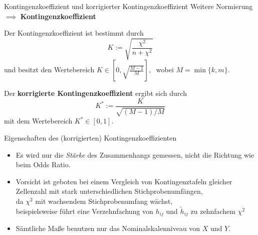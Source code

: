 \documentclass[
  10pt,
  ignorenonframetext,
]{beamer}
\providecommand{\tightlist}{%
  \setlength{\itemsep}{0pt}\setlength{\parskip}{0pt}}
\begin{document}

\begin{frame}{Kontingenzkoeffizient und korrigierter
Kontingenzkoeffizient}
\protect\hypertarget{kontingenzkoeffizient-und-korrigierter-kontingenzkoeffizient}{}
Weitere Normierung \(\implies\) \textbf{Kontingenzkoeffizient}

Der Kontingenzkoeffizient ist bestimmt durch \begin{displaymath}
K :=\sqrt{\frac{\chi^2}{n+\chi^2}}
\end{displaymath} und besitzt den Wertebereich
\(K\in\left[0,\sqrt{\frac{M-1}{M}}\right],\;\) wobei \(M=\min\{k,m\}.\)

Der \textbf{korrigierte Kontingenzkoeffizient} ergibt sich durch
\[K^* := \frac{K}{\sqrt{(M-1)/M}}\] mit dem Wertebereich
\(K^*\in[0,1]\).
\end{frame}

\begin{frame}{Eigenschaften des (korrigierten) Kontingenzkoeffizienten}
\protect\hypertarget{eigenschaften-des-korrigierten-kontingenzkoeffizienten}{}
\begin{itemize}
\tightlist
\item
  Es wird nur die \emph{Stärke} des Zusammenhangs gemessen, nicht die
  Richtung wie beim Odds Ratio.
\item
  Vorsicht ist geboten bei einem Vergleich von Kontingenztafeln gleicher
  Zellenzahl mit stark unterschiedlichen Stichprobenumfängen,\\
  da \(\chi^2\) mit wachsendem Stichprobenumfang wächst,\\
  beispielsweise führt eine Verzehnfachung von \(h_{ij}\) und
  \(\tilde h_{ij}\) zu zehnfachem \(\chi^2\)
\item
  Sämtliche Maße benutzen nur das Nominalskalenniveau von \(X\) und
  \(Y\).
\end{itemize}
\end{frame}
\end{document}
